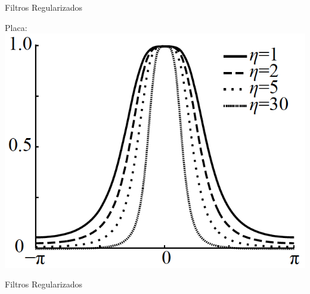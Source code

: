\documentclass[]{beamer}
\begin{document}
\begin{frame}{Filtros Regularizados}
\begin{center}

Placa:\\
\includegraphics[scale=0.6]{Images/FrecuenciaPlaca.png}

\end{center}
\end{frame}
\begin{frame}{Filtros Regularizados}
\begin{center}


\end{center}
\end{frame}
\end{document}
